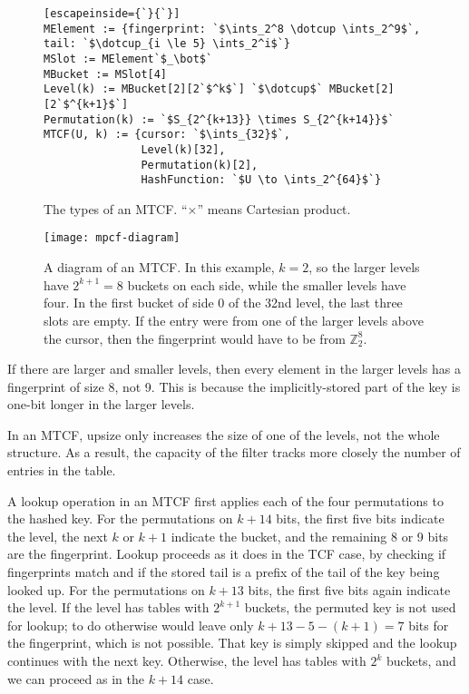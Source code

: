 \documentclass[manuscript,screen,review]{acmart}
\newcommand{\ints}{\mathbb{Z}}
\newcommand{\dotcup}{\ensuremath{\mathaccent\cdot\cup}}
\begin{document}
\begin{figure}

\begin{lstlisting}[escapeinside={`}{`}]
MElement := {fingerprint: `$\ints_2^8 \dotcup \ints_2^9$`, tail: `$\dotcup_{i \le 5} \ints_2^i$`}
MSlot := MElement`$_\bot$`
MBucket := MSlot[4]
Level(k) := MBucket[2][2`$^k$`] `$\dotcup$` MBucket[2][2`$^{k+1}$`]
Permutation(k) := `$S_{2^{k+13}} \times S_{2^{k+14}}$`
MTCF(U, k) := {cursor: `$\ints_{32}$`,
               Level(k)[32],
               Permutation(k)[2],
               HashFunction: `$U \to \ints_2^{64}$`}

\end{lstlisting}
\caption{The types of an MTCF.
``$\times$'' means Cartesian product.
}

\end{figure}


\begin{figure}
  \texttt{[image: mpcf-diagram]}
\caption{\label{mtcf-diagram}
A diagram of an MTCF.
In this example, $k = 2$, so the larger levels have $2^{k+1} = 8$ buckets on each side, while the smaller levels have four.
In the first bucket of side 0 of the 32nd level, the last three slots are empty.
If the entry were from one of the larger levels above the cursor, then the fingerprint would have to be from $\ints_2^8$.
}

\end{figure}


If there are larger and smaller levels, then every element in the larger levels has a fingerprint of size 8, not 9.
This is because the implicitly-stored part of the key is one-bit longer in the larger levels.

In an MTCF, upsize only increases the size of one of the levels, not the whole structure.
As a result, the capacity of the filter tracks more closely the number of entries in the table.

A lookup operation in an MTCF first applies each of the four permutations to the hashed key.
For the permutations on $k + 14$ bits, the first five bits indicate the level, the next $k$ or $k+1$ indicate the bucket, and the remaining 8 or 9 bits are the fingerprint.
Lookup proceeds as it does in the TCF case, by checking if fingerprints match and if the stored tail is a prefix of the tail of the key being looked up.
For the permutations on $k + 13$ bits, the first five bits again indicate the level.
If the level has tables with $2^{k+1}$ buckets, the permuted key is not used for lookup; to do otherwise would leave only $k+13 - 5 - (k+1) = 7$ bits for the fingerprint, which is not possible.
That key is simply skipped and the lookup continues with the next key. %
Otherwise, the level has tables with $2^k$ buckets, and we can proceed as in the $k+14$ case.
\end{document}

